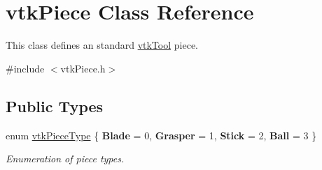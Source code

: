 \hypertarget{classvtkPiece}{
\section{vtkPiece Class Reference}
\label{classvtkPiece}
}


This class defines an standard \hyperlink{classvtkTool}{vtkTool} piece.  


{\ttfamily \#include $<$vtkPiece.h$>$}\subsection*{Public Types}
\begin{DoxyCompactItemize}
\item 
enum \hyperlink{classvtkPiece_a50da923e79e96537b7676a68947aa858}{vtkPieceType} \{ {\bfseries Blade} =  0, 
{\bfseries Grasper} =  1, 
{\bfseries Stick} =  2, 
{\bfseries Ball} =  3
 \}
\begin{DoxyCompactList}\small\item\em Enumeration of piece types. \item\end{DoxyCompactList}\end{DoxyCompactItemize}
